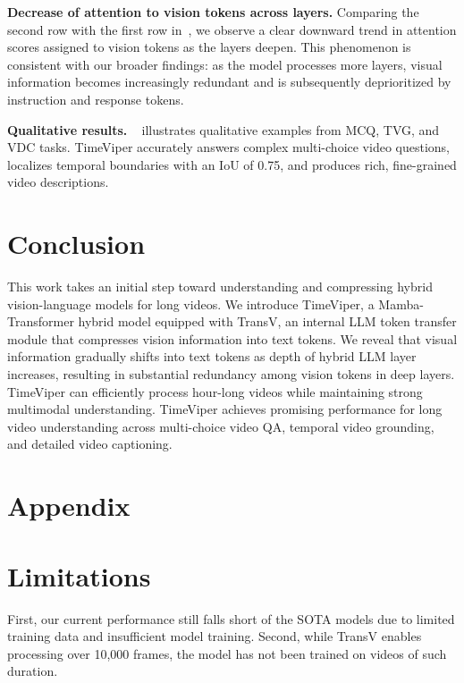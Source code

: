 \documentclass[10pt,twocolumn,letterpaper]{article}
\begin{document}
\noindent\textbf{Decrease of attention to vision tokens across layers.}
Comparing the second row with the first row in~, we observe a clear downward trend in attention scores assigned to vision tokens as the layers deepen. This phenomenon is consistent with our broader findings: as the model processes more layers, visual information becomes increasingly redundant and is subsequently deprioritized by instruction and response tokens.





\noindent\textbf{Qualitative results.}
~ illustrates qualitative examples from MCQ, TVG, and VDC tasks. TimeViper accurately answers complex multi-choice video questions, localizes temporal boundaries with an IoU of 0.75, and produces rich, fine-grained video descriptions.






\section{Conclusion}
This work takes an initial step toward understanding and compressing hybrid vision-language models for long videos.
We introduce TimeViper, a Mamba-Transformer hybrid model equipped with TransV, an internal LLM token transfer module that compresses vision information into text tokens.
We reveal that visual information gradually shifts into text tokens as depth of hybrid LLM layer increases, resulting in substantial redundancy among vision tokens in deep layers.
TimeViper can efficiently process hour-long videos while maintaining strong multimodal understanding.
TimeViper achieves promising performance for long video understanding across multi-choice video QA, temporal video grounding, and detailed video captioning.



\clearpage
\appendix
\section*{Appendix}


\section{Limitations}
First, our current performance still falls short of the SOTA models due to limited training data and insufficient model training. 
Second, while TransV enables processing over 10,000 frames, the model has not been trained on videos of such duration. 
\end{document}

